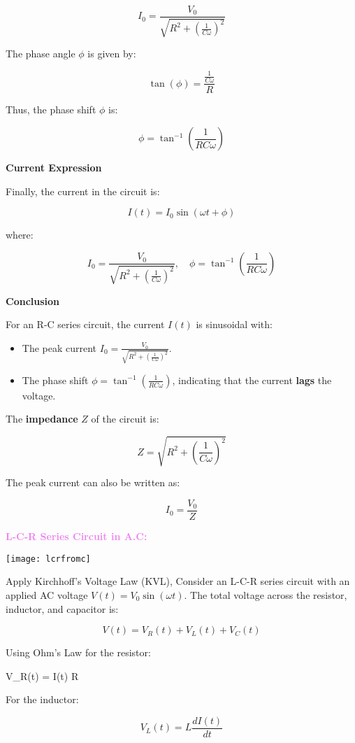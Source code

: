 \documentclass{beamer}
\begin{document}
\begin{frame}


\[
I_0 = \frac{V_0}{\sqrt{R^2 + \left( \frac{1}{C \omega} \right)^2}}
\]

The phase angle \( \phi \) is given by:

\[
\tan(\phi) = \frac{\frac{1}{C \omega}}{R}
\]

Thus, the phase shift \( \phi \) is:

\[
\phi = \tan^{-1}\left( \frac{1}{R C \omega} \right)
\]

\textbf{Current Expression}

Finally, the current in the circuit is:

\[
I(t) = I_0 \sin(\omega t + \phi)
\]

where:
\end{frame}


\begin{frame}

\[
I_0 = \frac{V_0}{\sqrt{R^2 + \left( \frac{1}{C \omega} \right)^2}}, \quad \phi = \tan^{-1}\left( \frac{1}{R C \omega} \right)
\]

\textbf{Conclusion}

For an R-C series circuit, the current \( I(t) \) is sinusoidal with:

\begin{itemize}
    \item The peak current \( I_0 = \frac{V_0}{\sqrt{R^2 + \left( \frac{1}{C \omega} \right)^2}} \).
    \item The phase shift \( \phi = \tan^{-1}\left( \frac{1}{R C \omega} \right) \), indicating that the current \textbf{lags} the voltage.
\end{itemize}

The \textbf{impedance} \( Z \) of the circuit is:

\[
Z = \sqrt{R^2 + \left( \frac{1}{C \omega} \right)^2}
\]

The peak current can also be written as:

\[
I_0 = \frac{V_0}{Z}
\]

\end{frame}

\begin{frame}
\textcolor{violet}{\textbf{L-C-R Series Circuit in A.C:}}
\begin{center}
\texttt{[image: lcrfromc]}
\end{center}
Apply Kirchhoff’s Voltage Law (KVL),
Consider an L-C-R series circuit with an applied AC voltage \( V(t) = V_0 \sin(\omega t) \). The total voltage across the resistor, inductor, and capacitor is:

\[
V(t) = V_R(t) + V_L(t) + V_C(t)
\]

Using Ohm’s Law for the resistor:

V_R(t) = I(t) R


For the inductor:

\[
V_L(t) = L \frac{dI(t)}{dt}
\]


\end{frame}
\end{document}
